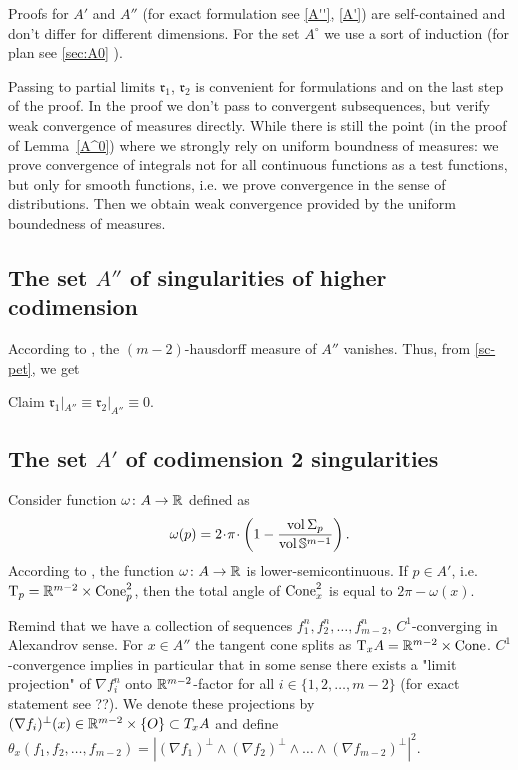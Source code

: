  Proofs for $A'$ and $A''$ (for exact formulation see \ref{A''}, \ref{A'})
 are self-contained and don't differ  for different dimensions.
  For the set  $A^\circ$  we use a sort of induction (for plan see \ref{sec:A0} ).
  
  Passing to partial limits
 $\mathfrak{r}_1$, $\mathfrak{r}_2$
is convenient for formulations and on the last step of the proof. In the proof we don't pass to
convergent subsequences, but verify weak convergence of
measures directly.
While there is still
the point (in the proof of Lemma~\ref{A^0}) where we strongly rely on uniform boundness 
of measures: we prove convergence of integrals 
not for all continuous functions as a test functions, but
only for
smooth functions, i.e. we prove convergence in the sense 
of distributions. Then we  obtain weak
convergence  provided by the uniform boundedness of measures.   




\subsection{The set $A''$ of  singularities of higher codimension }
According to \cite[10.6]{BGP}, the $(m-2)$-hausdorff measure of $A''$ vanishes.
Thus, from \ref{sc-pet}, we get

\begin{thm}{Claim}\label{A''}
$\mathfrak{r}_1|_{A''}\equiv\mathfrak{r}_2|_{A''}\equiv0$.
\end{thm}

\subsection{The set $A'$ of codimension 2 singularities  }
Consider function $\omega\colon A\to\mathbb{R}$ defined as
$$\omega(p)=2\cdot\pi\cdot\l(1-\frac{\vol\Sigma_p}{\vol\SS^{m-1}}\r).$$
According to \cite[7.14]{BGP}, the
function $\omega\colon A\to\mathbb{R}$ is lower-semicontinuous.
If $p\in A'$, i.e. $\text{\rm T}_p=\mathbb{R}^{m-2}\times \operatorname{Cone}^2_p$, then the total angle of $\operatorname{Cone}^2_x$ is equal to $2\pi-\omega(x)$.

Remind that we have a  collection of 
sequences $f_1^n,f_2^n,\dots,f_{m-2}^n$,  $C^1$-converging in Alexandrov sense.
For $x\in A''$ the tangent cone splits as
$\text{\rm T}_xA=\mathbb{R}^{m-2}\times \operatorname{Cone}$.  
$C^1$-convergence implies in particular 
that 
in some sense there exists  a "limit projection" of $\nabla f_i^n$ onto $\mathbb{R}^{m-2}$-factor for all $i\in \{1, 2, \dots, m-2\}$
(for exact statement see ??). We denote these projections by
$(\nabla f_i)^\bot(x)\in\mathbb{R}^{m-2}\times \{O\}\subset T_xA$
and define $\theta_x(f_1,f_2,\dots,f_{m-2})=
|(\nabla f_1)^\bot \wedge (\nabla f_2)^\bot\wedge\dots
  \wedge (\nabla f_{m-2})^\bot|^2$. 

